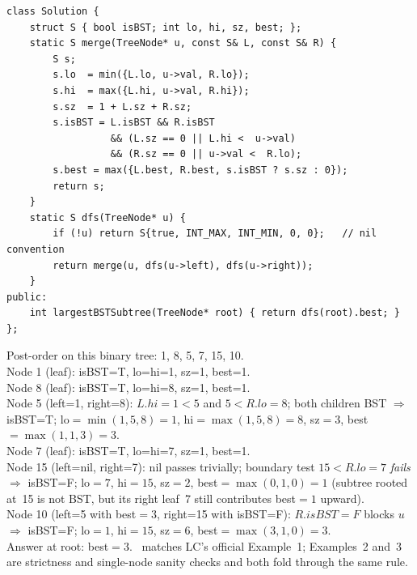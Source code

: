\begin{lstlisting}[caption={LeetCode 333 -- five-coordinate tuple, one post-order fold, \coderef{c10-fold} instantiated}, label={lst:c10-subtree-soln}]
class Solution {
    struct S { bool isBST; int lo, hi, sz, best; };
    static S merge(TreeNode* u, const S& L, const S& R) {
        S s;
        s.lo  = min({L.lo, u->val, R.lo});
        s.hi  = max({L.hi, u->val, R.hi});
        s.sz  = 1 + L.sz + R.sz;
        s.isBST = L.isBST && R.isBST
                  && (L.sz == 0 || L.hi <  u->val)
                  && (R.sz == 0 || u->val <  R.lo);
        s.best = max({L.best, R.best, s.isBST ? s.sz : 0});
        return s;
    }
    static S dfs(TreeNode* u) {
        if (!u) return S{true, INT_MAX, INT_MIN, 0, 0};   // nil convention
        return merge(u, dfs(u->left), dfs(u->right));
    }
public:
    int largestBSTSubtree(TreeNode* root) { return dfs(root).best; }
};
\end{lstlisting}

\begin{tracebox}
Post-order on this binary tree: 1, 8, 5, 7, 15, 10.\\
Node 1 (leaf): isBST=T, lo=hi=1, sz=1, best=1.\\
Node 8 (leaf): isBST=T, lo=hi=8, sz=1, best=1.\\
Node 5 (left=1, right=8): $L{.}\mathit{hi}=1<5$ and $5<R{.}\mathit{lo}=8$;
both children BST $\Rightarrow$ isBST=T; lo$=\min(1,5,8)=1$,
hi$=\max(1,5,8)=8$, sz$=3$, best$=\max(1,1,3)=3$.\\
Node 7 (leaf): isBST=T, lo=hi=7, sz=1, best=1.\\
Node 15 (left=nil, right=7): nil passes trivially; boundary test
$15<R{.}\mathit{lo}=7$ \emph{fails} $\Rightarrow$ isBST=F; lo$=7$, hi$=15$,
sz$=2$, best$=\max(0,1,0)=1$ (subtree rooted at~15 is not BST, but its
right leaf~7 still contributes best$=1$ upward).\\
Node 10 (left=5 with best$=3$, right=15 with isBST=F):
$R{.}\mathit{isBST}=F$ blocks $u$ $\Rightarrow$ isBST=F; lo$=1$, hi$=15$,
sz$=6$, best$=\max(3,1,0)=3$.\\
Answer at root: best$=3$. \checkmark\ matches LC's official Example~1;
Examples~2 and~3 are strictness and single-node sanity checks and both
fold through the same rule.
\end{tracebox}


